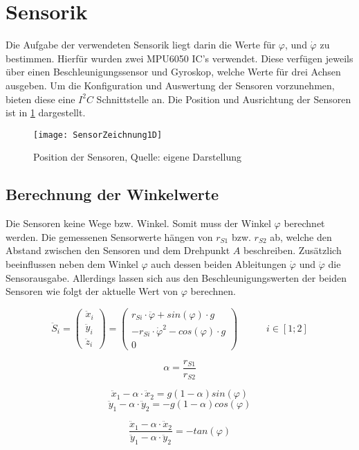 \section{Sensorik}
Die Aufgabe der verwendeten Sensorik liegt darin die Werte für $\varphi$, und $\dot{\varphi}$ zu bestimmen. Hierfür wurden zwei MPU6050 IC's verwendet. Diese verfügen jeweils über einen Beschleunigungssensor und Gyroskop, welche Werte für drei Achsen ausgeben. Um die Konfiguration und Auswertung der Sensoren vorzunehmen, bieten diese eine $I^2C$ Schnittstelle an. Die Position und Ausrichtung der Sensoren ist in \ref{Position_Sensoren_pic} dargestellt.

\begin{figure}[h]
\label{Position_Sensoren_pic}
\texttt{[image: SensorZeichnung1D]}
\caption{Position der Sensoren, Quelle: eigene Darstellung}
\end{figure}

\subsection{Berechnung der Winkelwerte}
Die Sensoren keine Wege bzw. Winkel. Somit muss der Winkel $\varphi$ berechnet werden. Die gemessenen Sensorwerte hängen von $r_{S1}$ bzw. $r_{S2}$ ab, welche den Abstand zwischen den Sensoren und dem Drehpunkt $A$ beschreiben. Zusätzlich beeinflussen neben dem Winkel $\varphi$ auch dessen beiden Ableitungen $\dot{\varphi}$ und $\ddot{\varphi}$ die Sensorausgabe. Allerdings lassen sich aus den Beschleunigungswerten der beiden Sensoren wie folgt der aktuelle Wert von $\varphi$ berechnen.

\begin{equation}
\ddot{S}_i = 
\begin{pmatrix}
\ddot{x}_i \\ \ddot{y}_i \\ \ddot{z}_i
\end{pmatrix} =
\begin{pmatrix}
r_{Si} \cdot \ddot{\varphi} + sin(\varphi) \cdot g \\
- r_{Si} \cdot \dot{\varphi}^2 - cos(\varphi) \cdot g \\
0
\end{pmatrix}
\hspace{35pt}
i \in [1;2]
\end{equation}

\begin{equation}
\alpha = \frac{r_{S1}}{r_{S2}}
\end{equation}

\begin{equation}
\ddot{x}_1 - \alpha \cdot \ddot{x}_2 = 
g(1 - \alpha)sin(\varphi)
\end{equation}
\begin{equation}
\ddot{y}_1 - \alpha \cdot \ddot{y}_2 = 
-g(1- \alpha)cos(\varphi)
\end{equation}

\begin{equation}
\frac{\ddot{x}_1 - \alpha \cdot \ddot{x}_2}{\ddot{y}_1 - \alpha \cdot \ddot{y}_2} = -tan(\varphi)
\end{equation}

